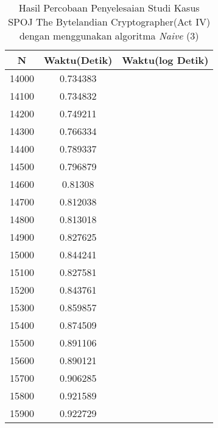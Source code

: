 \begin{table}[H]
\centering
\caption {Hasil Percobaan Penyelesaian Studi Kasus SPOJ The Bytelandian Cryptographer(Act IV) dengan menggunakan algoritma \textit{Naive} (3)}
\begin{tabular}{|c|c|c|}\hline
N&Waktu(Detik)&Waktu(log Detik)\\ \hline
14000&0.734383\\ \hline
14100&0.734832\\ \hline
14200&0.749211\\ \hline
14300&0.766334\\ \hline
14400&0.789337\\ \hline
14500&0.796879\\ \hline
14600&0.81308\\ \hline
14700&0.812038\\ \hline
14800&0.813018\\ \hline
14900&0.827625\\ \hline
15000&0.844241\\ \hline
15100&0.827581\\ \hline
15200&0.843761\\ \hline
15300&0.859857\\ \hline
15400&0.874509\\ \hline
15500&0.891106\\ \hline
15600&0.890121\\ \hline
15700&0.906285\\ \hline
15800&0.921589\\ \hline
15900&0.922729\\ \hline
\end{tabular}
\label{tab:res6}
\end{table}
